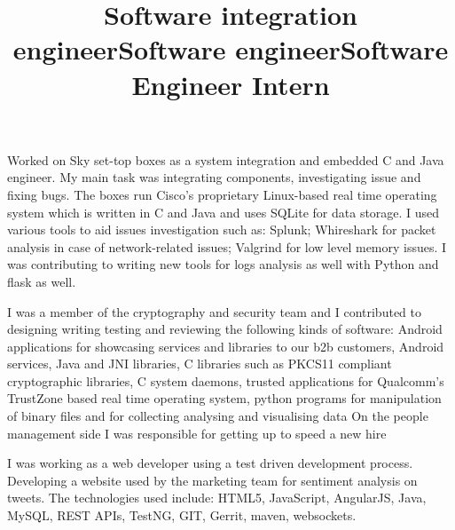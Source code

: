 \begin{resume}
        \title{Software integration engineer}
        \begin{position}
            Worked on Sky set-top boxes as a system integration and embedded C and Java engineer.
            My main task was integrating components, investigating issue and fixing bugs.
            The boxes run Cisco's proprietary Linux-based real time operating system which is written in C and Java
            and uses SQLite for data storage.
            I used various tools to aid issues investigation such as: Splunk;
            Whireshark for packet analysis in case of network-related issues;
            Valgrind for low level memory issues.
            I was contributing to writing new tools for logs analysis as well with Python and flask as well.
        \end{position}
        \title{Software engineer}
        \begin{position}
            I was a member of the cryptography and security team and
            I contributed to designing writing testing and reviewing the following kinds of software:
            Android applications for showcasing services and libraries to our b2b customers,
            Android services,
            Java and JNI libraries,
            C libraries such as PKCS11 compliant cryptographic libraries,
            C system daemons,
            trusted applications for Qualcomm's TrustZone based real time operating system,
            python programs for manipulation of binary files and for collecting analysing and visualising data
            On the people management side I was responsible for getting up to speed a new hire
        \end{position}
        \title{Software Engineer Intern}
        \begin{position}
            I was working as a web developer using a test driven development process.
            Developing a website used by the marketing team for sentiment analysis on tweets.
            The technologies used include: HTML5, JavaScript, AngularJS, Java, MySQL, REST APIs, TestNG, GIT, Gerrit, maven, websockets.

\end{position}
\end{resume}
